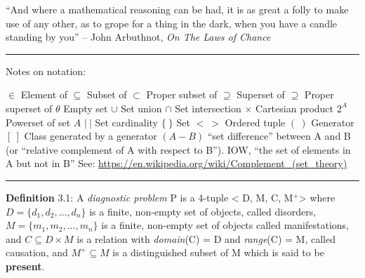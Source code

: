 \documentclass{article}
\begin{document}
``And where a mathematical reasoning can be had, it is as great a folly to make
use of any other, as to grope for a thing in the dark, when you have a candle
standing by you'' -- John Arbuthnot, \textit{On The Laws of Chance}
\newline

\rule{12cm}{0.4pt}

\par 
Notes on notation:

$\in$ \quad Element of
\newline
$\subseteq$ \quad Subset of
\newline
$\subset$ \quad Proper subset of
\newline
$\supseteq$ \quad Superset of
\newline
$\supseteq$ \quad Proper superset of
\newline
$\theta$ \quad Empty set
\newline
$\cup$ \quad Set union
\newline
$\cap$ \quad Set intersection
\newline
$\times$ \quad Cartesian product
\newline
$2^A$ \quad Powerset of set $A$
\newline
$|\ |$ \quad Set cardinality
\newline
$\{\ \}$ \quad Set
\newline
$<\ >$ \quad Ordered tuple
\newline
$(\ )$ \quad Generator
\newline
$[\ ]$ \quad Class generated by a generator
\newline
$(A - B)$ \quad ``set difference'' between A and B (or
``relative complement of A with respect to B''). IOW, ``the set of elements in A
but not in B'' See:\newline
\url{https://en.wikipedia.org/wiki/Complement_(set_theory)}\newline
\rule{12cm}{0.4pt}
\newline

\par
\textbf{Definition} 3.1: A \textit{diagnostic problem} P is a 4-tuple \textless
D, M, C, M$^{+}$\textgreater {} where $D = \{d_1, d_2, \ldots, d_n\}$ is a finite,
non-empty set of objects, called disorders, $M = \{m_1, m_2, \ldots, m_n\}$ is a
finite, non-empty set of objects called manifestations, and $C \subseteq D
\times M$ is a relation with \textit{domain}(C) = D and \textit{range}(C) = M,
called causation, and $M^{+} \subseteq M$ is a distinguished subset of M which is said to be
\textbf{present}.
\newline
\end{document}
